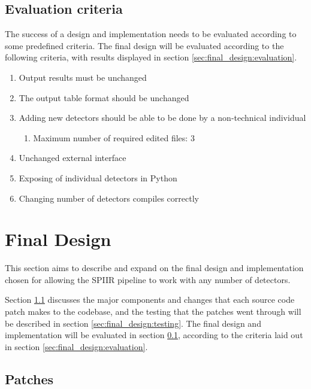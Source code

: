 \documentclass{article}
\begin{document}
\subsection{Evaluation criteria} \label{sec:design_process:criteria}

The success of a design and implementation needs to be evaluated according to some predefined criteria.
The final design will be evaluated according to the following criteria, with results displayed in section \ref{sec:final_design:evaluation}.

\begin{enumerate}
    \item Output results must be unchanged
    \item The output table format should be unchanged
    \item Adding new detectors should be able to be done by a non-technical individual
        \begin{enumerate}
            \item Maximum number of required edited files: 3
        \end{enumerate}
    \item Unchanged external interface
    \item Exposing of individual detectors in Python
    \item Changing number of detectors compiles correctly
\end{enumerate}

\section{Final Design} \label{sec:final_design}

This section aims to describe and expand on the final design and implementation chosen for allowing the SPIIR pipeline to work with any number of detectors.

Section \ref{sec:final_design:patches} discusses the major components and changes that each source code patch makes to the codebase, and the testing that the patches went through will be described in section \ref{sec:final_design:testing}.
The final design and implementation will be evaluated in section \ref{sec:design_process:criteria}, according to the criteria laid out in section \ref{sec:final_design:evaluation}.

\subsection{Patches} \label{sec:final_design:patches}
\end{document}
